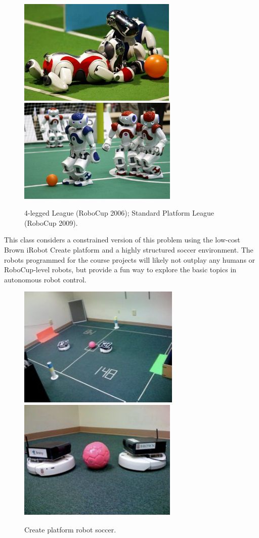 \begin{figure}
\centerline{
\mbox{\includegraphics[width=2.98in]{figures/1_robocup06.jpg}}
\mbox{\includegraphics[width=3.00in]{figures/1_robocup09.jpg}}
}
\caption{4-legged League (RoboCup 2006); Standard Platform League (RoboCup 2009).}
\end{figure}

This class considers a constrained version of this problem using the low-cost Brown iRobot Create platform and a highly structured soccer environment.  The robots programmed for the course projects will likely not outplay any humans or RoboCup-level robots, but provide a fun way to explore the basic topics in autonomous robot control.

\begin{figure}
\centerline{
\mbox{\includegraphics[width=3.04in]{figures/1_soccer1.jpg}}
\mbox{\includegraphics[width=3.00in]{figures/1_soccer2.jpg}}
}
\caption{Create platform robot soccer.}
\end{figure}

